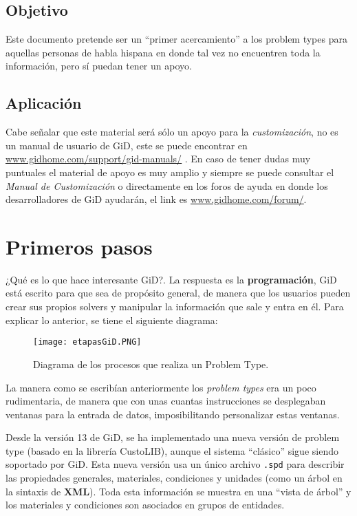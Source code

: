 \documentclass[10pt, a4paper, twocolumn]{article} %
\begin{document}
\subsection{Objetivo}

Este documento pretende ser un ``primer acercamiento'' a los problem types para aquellas personas de habla hispana en donde tal vez no encuentren toda la información, pero sí puedan tener un apoyo.

\subsection{Aplicación}

Cabe señalar que este material será sólo un apoyo para la \textit{customización}, no es un manual de usuario de GiD, este se puede encontrar en \textcolor{BlueGiD}{\underline{\url{www.gidhome.com/support/gid-manuals/}}} . En caso de tener dudas muy puntuales el material de apoyo es muy amplio y siempre se puede consultar el \textit{Manual de Customización} o directamente en los foros de ayuda en donde los desarrolladores de GiD ayudarán, el link es \textcolor{BlueGiD}{\underline{\url{www.gidhome.com/forum/}}}.

\section{Primeros pasos}

¿Qué es lo que hace interesante GiD?. La respuesta es la \textbf{programación}, GiD está escrito para que sea de propósito general, de manera que los usuarios pueden crear sus propios solvers y manipular la información que sale y entra en él. Para explicar lo anterior, se tiene el siguiente diagrama:

\begin{figure}[hbt!]\centering
	\texttt{[image: etapasGiD.PNG]}
	\caption{Diagrama de los procesos que realiza un Problem Type.}
	\label{fig:diagramaProcesos}
\end{figure}

La manera como se escribían anteriormente los \textit{problem types} era un poco rudimentaria, de manera que con unas cuantas instrucciones se desplegaban ventanas para la entrada de datos, imposibilitando personalizar estas ventanas.

Desde la versión 13 de GiD, se ha implementado una nueva versión de problem type (basado en la librería CustoLIB), aunque el sistema ``clásico'' sigue siendo soportado por GiD. Esta nueva versión usa un único archivo \texttt{.spd} para describir las propiedades generales, materiales, condiciones y unidades (como un árbol en la sintaxis de \textbf{XML}). Toda esta información se muestra en una ``vista de árbol'' y los materiales y condiciones son asociados en grupos de entidades.
\end{document}
